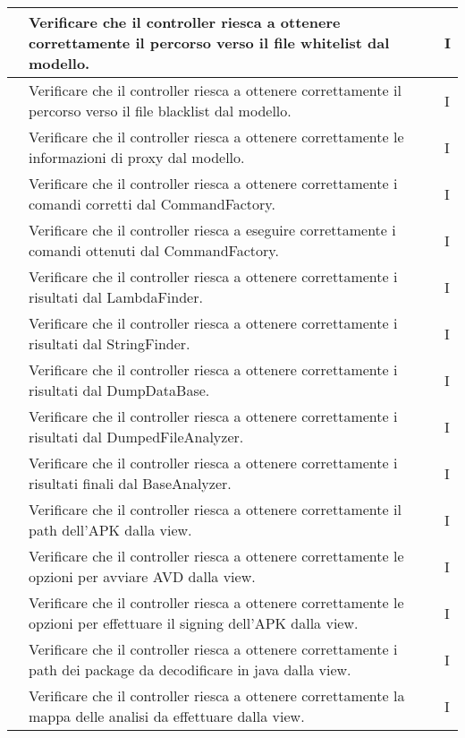 \begin{center}
\begin{longtable}{ |C{3cm} | C{8.5cm}| C{1.5cm} |}
         &Verificare che il controller riesca a ottenere correttamente il percorso verso il file whitelist dal modello.& I \\\hline
         &Verificare che il controller riesca a ottenere correttamente il percorso verso il file blacklist dal modello.& I \\\hline
         &Verificare che il controller riesca a ottenere correttamente le informazioni di proxy dal modello.& I \\\hline
         &Verificare che il controller riesca a ottenere correttamente i comandi corretti dal CommandFactory.& I \\\hline
         &Verificare che il controller riesca a eseguire correttamente i comandi ottenuti dal CommandFactory.& I \\\hline
         &Verificare che il controller riesca a ottenere correttamente i risultati dal LambdaFinder.& I \\\hline
         &Verificare che il controller riesca a ottenere correttamente i risultati dal StringFinder.& I \\\hline
         &Verificare che il controller riesca a ottenere correttamente i risultati dal DumpDataBase.& I \\\hline
         &Verificare che il controller riesca a ottenere correttamente i risultati dal DumpedFileAnalyzer.& I \\\hline
         &Verificare che il controller riesca a ottenere correttamente i risultati finali dal BaseAnalyzer.& I \\\hline
         &Verificare che il controller riesca a ottenere correttamente il path dell'APK dalla view.& I \\\hline
         &Verificare che il controller riesca a ottenere correttamente le opzioni per avviare AVD dalla view.& I \\\hline
         &Verificare che il controller riesca a ottenere correttamente le opzioni per effettuare il signing dell'APK dalla view.& I \\\hline
         &Verificare che il controller riesca a ottenere correttamente i path dei package da decodificare in java dalla view.& I \\\hline
         &Verificare che il controller riesca a ottenere correttamente la mappa delle analisi da effettuare dalla view.& I \\\hline

\end{longtable}
\end{center}
